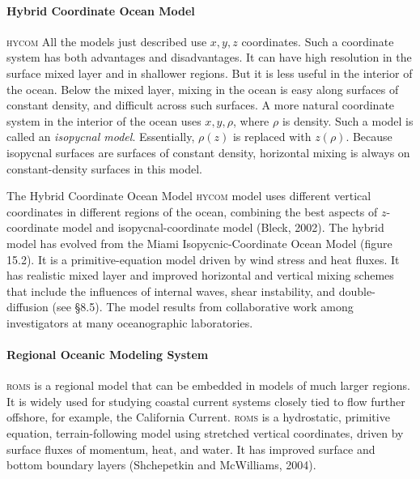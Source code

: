 \paragraph{Hybrid Coordinate Ocean Model}
\textsc{hycom} All the models just
described use $x, y, z$ coordinates. Such a coordinate system has both
advantages and disadvantages. It can have high resolution in the
surface mixed layer and in shallower regions. But it is less useful in
the interior of the ocean. Below the mixed layer,
mixing in the ocean is
easy along surfaces of constant density, and difficult across such
surfaces. A more natural coordinate system in the interior of the
ocean uses $x, y, \rho$, where $\rho$ is density. Such a model is
called an \textit{isopycnal model}. Essentially, $\rho (z)$ is replaced with
$z (\rho )$. Because isopycnal surfaces are surfaces of constant
density, horizontal mixing is always
on constant-density surfaces in this model.

The Hybrid Coordinate Ocean Model \textsc{hycom} model uses different
vertical coordinates in different regions of the ocean, combining the
best aspects of $z$-coordinate model and isopycnal-coordinate model
(Bleck, 2002). The hybrid model has evolved from the Miami
Isopycnic-Coordinate Ocean Model (figure 15.2). It is a
primitive-equation model driven by wind stress and heat fluxes. It has realistic
mixed layer and improved horizontal and vertical mixing schemes that
include the influences of internal waves, shear instability, and
double-diffusion (see \S 8.5). The model results from collaborative
work among investigators at many oceanographic laboratories.

\paragraph{Regional Oceanic Modeling System}
\textsc{roms} is a regional model that can be embedded in models of
much larger regions. It is widely used for studying coastal current
systems closely tied to flow further offshore, for example, the
California Current. \textsc{roms} is a hydrostatic, primitive
equation, terrain-following model using stretched vertical
coordinates, driven by surface fluxes of momentum, heat, and water. It
has improved surface and bottom boundary layers (Shchepetkin and
McWilliams, 2004).

